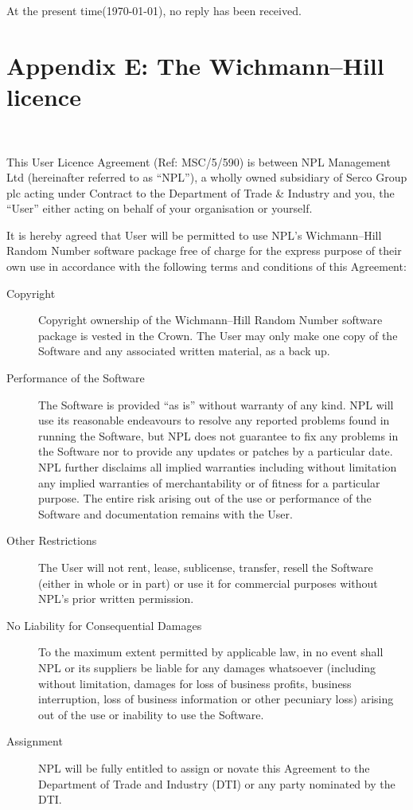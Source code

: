 \documentclass[letterpaper,12pt]{article}
\begin{document}
\noindent
At the present time(\today), no reply has been received.

\pagebreak
\section*{Appendix E: The Wichmann--Hill licence}
{\hspace{1.5cm}{\bf SOFTWARE END-USER LICENCE AGREEMENT}}\\
{\small\raggedright
This User Licence Agreement (Ref: MSC/5/590) is between NPL Management Ltd
(hereinafter referred to as “NPL”), a wholly owned subsidiary of Serco
Group plc acting under Contract to the Department of Trade \& Industry and
you, the ``User'' either acting on behalf of your organisation or yourself.

It is hereby agreed that User will be permitted to use NPL's Wichmann--Hill
Random Number software package free of charge for the express purpose of
their own use in accordance with the following terms and conditions of this
Agreement:
\begin{description}
\item[Copyright]
  Copyright ownership of the Wichmann--Hill Random Number software package
  is vested in the Crown. The User may only make one copy of the Software
  and any associated written material, as a back up.
\item[Performance of the Software]
  The Software is provided “as is” without warranty of any kind. NPL will
  use its reasonable endeavours to resolve any reported problems found in
  running the Software, but NPL does not guarantee to fix any problems in
  the Software nor to provide any updates or patches by a particular
  date. NPL further disclaims all implied warranties including without
  limitation any implied warranties of merchantability or of fitness for
  a particular purpose. The entire risk arising out of the use or
  performance of the Software and documentation remains with the User.
\item[Other Restrictions]
  The User will not rent, lease, sublicense, transfer, resell the Software
  (either in whole or in part) or use it for commercial purposes without
  NPL’s prior written permission.
\item[No Liability for Consequential Damages]
  To the maximum extent permitted by applicable law, in no event shall NPL
  or its suppliers be liable for any damages whatsoever (including without
  limitation, damages for loss of business profits, business interruption,
  loss of business information or other pecuniary loss) arising out of
  the use or inability to use the Software.
\item[Assignment]
  NPL will be fully entitled to assign or novate this Agreement to the
  Department of Trade and Industry (DTI) or any party nominated by the DTI.
\end{description}

}
\end{document}
